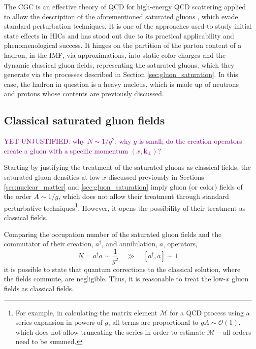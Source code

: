 The \gls{CGC} is an effective theory of \gls{QCD} for high-energy \gls{QCD} scattering applied to allow the description of the aforementioned saturated gluons \cite{Gelis_2010}, which evade standard perturbation techniques. It is one of the approaches used to study initial state effects in \glspl{HIC} and has stood out due to its practical applicability and phenomenological success.\cite{Albacete_2014} It hinges on the partition of the parton content of a hadron, in the \gls{IMF},
via approximations, into static color charges and the dynamic classical gluon fields, representing the saturated gluons, which they generate via the processes described in Section \ref{sec:gluon_saturation}.\cite{Gelis_2010} In this case, the hadron in question is a heavy nucleus, which is made up of neutrons and protons whose contents are previously discussed.


\subsection{Classical saturated gluon fields}
\textcolor{purple}{YET UNJUSTIFIED: why $N \sim 1/g^2$; why $g$ is small; do the creation operators create a gluon with a specific momentum $(x,\mathbf{k}_\perp)$?}

Starting by justifying the treatment of the saturated gluons as classical fields, the saturated gluon densities at low-$x$ discussed previously in Sections \ref{sec:nuclear_matter} and \ref{sec:gluon_saturation} imply gluon (or color) fields of the order $A \sim 1/g$, which does not allow their treatment through standard perturbative techniques\footnote{For example, in calculating the matrix element $\mathcal{M}$ for a \gls{QCD} process using a series expansion in powers of $g$, all terms are proportional to $gA \sim \mathcal{O}(1)$, which does not allow truncating the series in order to estimate $\mathcal{M}$ -- all orders need to be summed.}.\cite{Albacete_2014} However, it opens the possibility of their treatment as classical fields.

Comparing the occupation number of the saturated gluon fields and the commutator of their creation, $a^\dagger$, and annihilation, $a$, operators, \cite{Albacete_2014}
\begin{equation}
	N = a^\dagger a \sim \frac{1}{g^2} \quad \gg \quad [a^\dagger, a] \sim 1
\end{equation}
it is possible to state that quantum corrections to the classical solution, where the fields commute, are negligible. Thus, it is reasonable to treat the low-$x$ gluon fields as classical fields.

